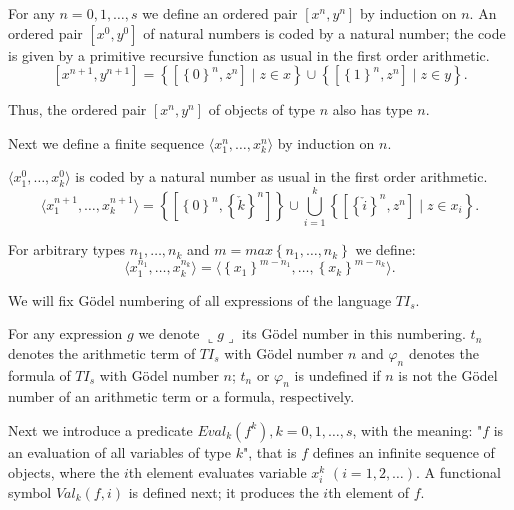 \documentclass{asl}
\theoremstyle{definition}
\begin{document}
For any $n=0,1,\ldots,s$ we define an ordered pair $\left[ x^n,y^n \right]$ by induction on $n$. An ordered pair $\left[x^0,y^0\right]$ of natural numbers is coded by a natural number; the code is given by a primitive recursive function as usual in the first order arithmetic. 
\[\left[x^{n+1},y^{n+1}\right]=\left\lbrace \left[\left\lbrace 0\right\rbrace ^n,z^n\right]\mid z\in x\right\rbrace \cup 
\left\lbrace \left[\left\lbrace 1\right\rbrace ^n,z^n\right]\mid z\in y\right\rbrace.\]

Thus, the ordered pair $\left[x^n,y^n\right]$ of objects of type $n$ also has type $n$.

Next we define a finite sequence $\langle x_1^n,\ldots,x_k^n\rangle$ by induction on $n$. 

$\langle x_1^0,\ldots,x_k^0\rangle$ is coded by a natural number as usual in the first order arithmetic.
\[\langle x_1^{n+1},\ldots,x_k^{n+1}\rangle=
\left\lbrace \left[ \left\lbrace 0\right\rbrace ^n,\left\lbrace \check{k}\right\rbrace ^n\right] \right\rbrace\cup 
\bigcup_{i=1}^k \left\lbrace \left[\left\lbrace \check{i}\right\rbrace ^n,z^n\right]\mid z\in x_i\right\rbrace . \]

For arbitrary types $n_1,\ldots,n_k$ and $m=max\left\lbrace n_1,\ldots,n_k \right\rbrace$ we define:
\[\langle x_1^{n_1},\ldots,x_k^{n_k}\rangle=\langle \left\lbrace x_1\right\rbrace ^{m-n_1},\ldots,\left\lbrace x_k\right\rbrace ^{m-n_k}\rangle.\]

We will fix G\"{o}del numbering of all expressions of the language $TI_s$. 

For any expression $g$ we denote $\llcorner g\lrcorner$ its G\"{o}del number in this numbering. $t_n$ denotes the arithmetic term of $TI_s$ with G\"{o}del number $n$ and $\varphi_n$ denotes the formula of $TI_s$ with G\"{o}del number $n$; $t_n$ or $\varphi_n$ is undefined if $n$ is not the G\"{o}del number of an arithmetic term or a formula,  respectively.

Next we introduce a predicate $Eval_k(f^k), k=0,1,\ldots,s$, with the meaning: "$f$ is an evaluation of all variables of type $k$", that is $f$ defines an infinite sequence of objects, where the $i$th element evaluates variable $x_i^k$ $(i=1, 2,\ldots)$. A functional symbol $Val_k(f,i)$ is defined next; it produces the $i$th element of $f$.
\end{document}
